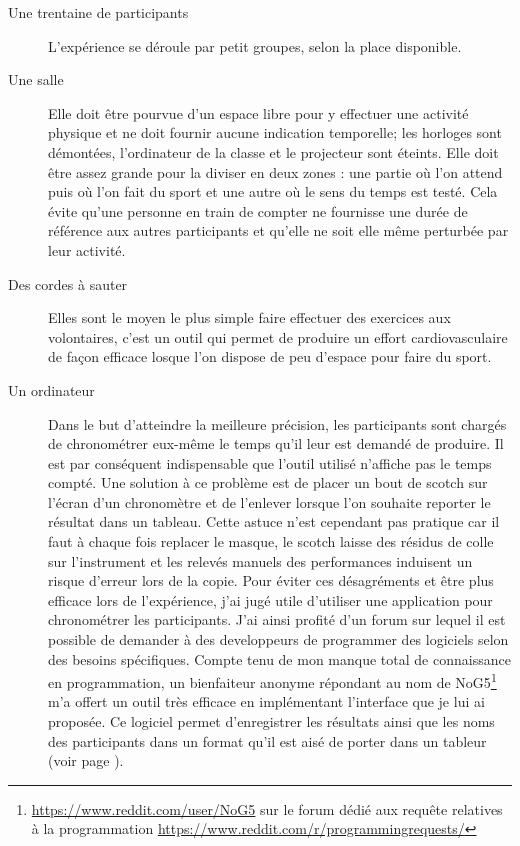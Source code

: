\documentclass[12pt,fleqn,oneside,openany]{book} %
\begin{document}
\begin{description}
	\item[Une trentaine de participants] L'expérience se déroule par petit groupes, selon la place disponible.
	\item[Une salle] Elle doit être pourvue d'un espace libre pour y effectuer une activité physique et ne doit fournir aucune indication temporelle; les horloges sont démontées, l'ordinateur de la classe et le projecteur sont éteints. Elle doit être assez grande pour la diviser en deux zones : une partie où l'on attend puis où l'on fait du sport et une autre où le sens du temps est testé. Cela évite qu'une personne en train de compter ne fournisse une durée de référence aux autres participants et qu'elle ne soit elle même perturbée par leur activité. 
	\item[Des cordes à sauter] Elles sont le moyen le plus simple faire effectuer des exercices aux volontaires, c'est un outil qui permet de produire un effort cardiovasculaire de façon efficace losque l'on dispose de peu d'espace pour faire du sport.
	\item[Un ordinateur] Dans le but d'atteindre la meilleure précision, les participants sont chargés de chronométrer eux-même le temps qu'il leur est demandé de produire. Il est par conséquent indispensable que l'outil utilisé n'affiche pas le temps compté. Une solution à ce problème est de placer un bout de scotch sur l'écran d'un chronomètre et de l'enlever lorsque l'on souhaite reporter le résultat dans un tableau. Cette astuce n'est cependant pas pratique car il faut à chaque fois replacer le masque, le scotch laisse des résidus de colle sur l'instrument et les relevés manuels des performances induisent un risque d'erreur lors de la copie. Pour éviter ces désagréments et être plus efficace lors de l'expérience, j'ai jugé utile d'utiliser une application pour chronométrer les participants. J'ai ainsi profité d'un forum sur lequel il est possible de demander à des developpeurs de programmer des logiciels selon des besoins spécifiques. Compte tenu de mon manque total de connaissance en programmation, un bienfaiteur anonyme répondant au nom de NoG5\footnote{\url{https://www.reddit.com/user/NoG5} sur le forum dédié aux requête relatives à la programmation \url{https://www.reddit.com/r/programmingrequests/}} m'a offert un outil très efficace en implémentant l'interface que je lui ai proposée. Ce logiciel permet d'enregistrer les résultats ainsi que les noms des participants dans un format qu'il est aisé de porter dans un tableur (voir page \pageref{sec:chrono}).
\end{description}
\end{document}
